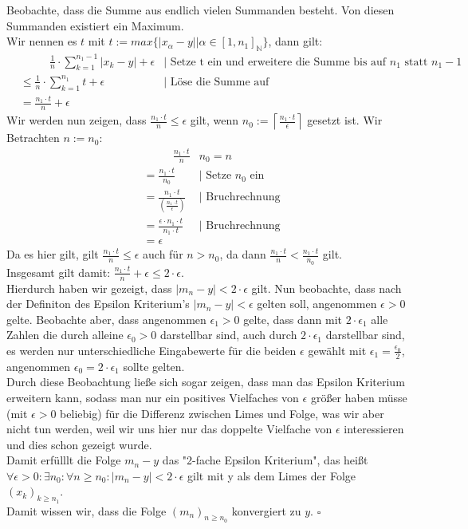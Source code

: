 \documentclass[12pt, a4paper]{article}
\newcommand*{\qed}{\null\nobreak\hfill\ensuremath{\square}}
\newcommand*{\puffer}{\text{ }\text{ }\text{ }\text{ }}
\begin{document}
Beobachte, dass die Summe aus endlich vielen Summanden besteht. Von diesen Summanden existiert ein Maximum.\\
Wir nennen es $t$ mit $t := max\big\{|x_\alpha - y| \big| \alpha \in [1,n_1]_\mathbb{N}\big\}$, dann gilt:
\begin{align*}
    & \puffer \frac{1}{n} \cdot \sum_{k=1}^{n_1 -1 }|x_k - y| + \epsilon & \text{| Setze t ein und erweitere die Summe bis auf $n_1$ statt $n_1-1$} \\
    & \le \frac{1}{n} \cdot \sum_{k=1}^{n_1}t + \epsilon & \text{| Löse die Summe auf} \\
    & = \frac{n_1 \cdot t}{n} + \epsilon
\end{align*}
Wir werden nun zeigen, dass $\frac{n_1 \cdot t}{n} \le \epsilon$ gilt, wenn $n_0 := \left\lceil\frac{n_1 \cdot t}{\epsilon}\right\rceil$ gesetzt ist. Wir Betrachten $n := n_0$:
\begin{align*}
    & \puffer \frac{n_1 \cdot t}{n} & n_0 = n \\
    & = \frac{n_1 \cdot t}{n_0} & \text{| Setze $n_0$ ein} \\
    & = \frac{n_1 \cdot t}{\left(\frac{n_1 \cdot t}{\epsilon}\right)} & \text{| Bruchrechnung} \\
    & = \frac{\epsilon \cdot n_1 \cdot t}{n_1 \cdot t} & \text{| Bruchrechnung} \\
    & = \epsilon
\end{align*}
Da es hier gilt, gilt $\frac{n_1 \cdot t}{n} \le \epsilon$ auch für $n > n_0$, da dann $\frac{n_1 \cdot t}{n} < \frac{n_1 \cdot t}{n_0}$ gilt. \\
Insgesamt gilt damit: $\frac{n_1 \cdot t}{n} + \epsilon \le 2 \cdot \epsilon$. \\
Hierdurch haben wir gezeigt, dass $|m_n - y| < 2\cdot \epsilon$ gilt.
Nun beobachte, dass nach der Definiton des Epsilon Kriterium's  $|m_n - y| < \epsilon$ gelten soll, angenommen $\epsilon > 0$ gelte. Beobachte aber, dass angenommen $\epsilon_1 > 0$ gelte, dass dann mit $2\cdot \epsilon_1$ alle Zahlen die durch alleine $\epsilon_0 > 0$ darstellbar sind, auch durch $2\cdot \epsilon_1$ darstellbar sind, es werden nur unterschiedliche Eingabewerte für die beiden $\epsilon$ gewählt mit $\epsilon_1 = \frac{\epsilon_0}2$, angenommen $\epsilon_0 = 2\cdot \epsilon_1$ sollte gelten. \\
Durch diese Beobachtung ließe sich sogar zeigen, dass man das Epsilon Kriterium erweitern kann, sodass man nur ein positives Vielfaches von $\epsilon$ größer haben müsse (mit $\epsilon > 0 $ beliebig) für die Differenz zwischen Limes und Folge, was wir aber nicht tun werden, weil wir uns hier nur das doppelte Vielfache von $\epsilon$ interessieren und dies schon gezeigt wurde. \\
Damit erfülllt die Folge $m_n - y$ das "2-fache Epsilon Kriterium", das heißt\\
$\forall \epsilon > 0: \exists n_0: \forall n \ge n_0: |m_n - y| < 2 \cdot \epsilon$ gilt mit y als dem Limes der Folge $(x_k)_{k\ge n_1}$. \\
Damit wissen wir, dass die Folge $(m_n)_{n \ge n_0}$ konvergiert zu $y$. \qed
\end{document}
